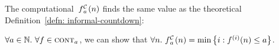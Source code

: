 \noindent The computational~$\cdt{f}{a}(n)$
finds the same value as the theoretical
Definition~\ref{defn: informal-countdown}:
\begin{thm} \label{thm: cdt-repeat}
	\href{https://github.com/inv-ack/inv-ack/blob/7270e64a2600b771f2b1b1b151f7d13fb2ae6c97/countdown.v#L191-L217}{\color{blue}\coq}
	$\forall a \in \mathbb{N}.~ \forall f\in \text{\scshape{cont}}_{a}$, we can show that \lb
$	\forall n.~ \cdt{f}{a}(n) = \min\left\{ i : f^{(i)}(n) \le a \right\} $.
\end{thm}
